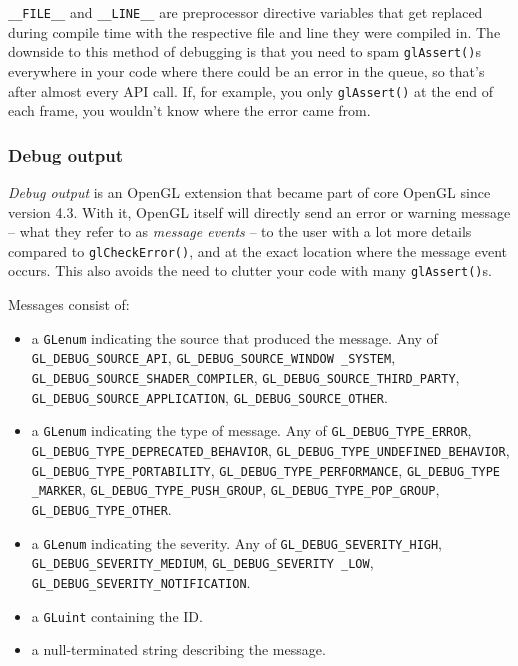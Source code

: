 \documentclass[8pt, table, xcdraw]{article}%
\begin{document}
\lstinline{__FILE__} and \lstinline{__LINE__} are preprocessor directive variables that get replaced during compile time with the respective file and line they were compiled in. The downside to this method of debugging is that you need to spam \lstinline|glAssert()|s everywhere in your code where there could be an error in the queue, so that's after almost every API call. If, for example, you only \lstinline|glAssert()| at the end of each frame, you wouldn't know where the error came from.

\subsubsection{Debug output}
    
\emph{Debug output} is an OpenGL extension that became part of core OpenGL since version 4.3. With it, OpenGL itself will directly send an error or warning message -- what they refer to as \emph{message events} -- to the user with a lot more details compared to \lstinline|glCheckError()|, and at the exact location where the message event occurs. This also avoids the need to clutter your code with many \lstinline|glAssert()|s.

Messages consist of:

\begin{itemize}
    \item a \lstinline{GLenum} indicating the source that produced the message. Any of \lstinline{GL_DEBUG_SOURCE_API}, \lstinline{GL_DEBUG_SOURCE_WINDOW _SYSTEM}, \lstinline{GL_DEBUG_SOURCE_SHADER_COMPILER}, \lstinline{GL_DEBUG_SOURCE_THIRD_PARTY}, \lstinline{GL_DEBUG_SOURCE_APPLICATION}, \lstinline{GL_DEBUG_SOURCE_OTHER}.
    \item a \lstinline{GLenum} indicating the type of message. Any of \lstinline{GL_DEBUG_TYPE_ERROR}, \lstinline{GL_DEBUG_TYPE_DEPRECATED_BEHAVIOR}, \lstinline{GL_DEBUG_TYPE_UNDEFINED_BEHAVIOR}, \lstinline{GL_DEBUG_TYPE_PORTABILITY}, \lstinline{GL_DEBUG_TYPE_PERFORMANCE}, \lstinline{GL_DEBUG_TYPE _MARKER}, \lstinline{GL_DEBUG_TYPE_PUSH_GROUP}, \lstinline{GL_DEBUG_TYPE_POP_GROUP}, \lstinline{GL_DEBUG_TYPE_OTHER}.
    \item a \lstinline{GLenum} indicating the severity. Any of \lstinline{GL_DEBUG_SEVERITY_HIGH}, \lstinline{GL_DEBUG_SEVERITY_MEDIUM}, \lstinline{GL_DEBUG_SEVERITY _LOW}, \lstinline{GL_DEBUG_SEVERITY_NOTIFICATION}.
    \item a \lstinline{GLuint} containing the ID.
    \item a null-terminated string describing the message.
\end{itemize}
\end{document}
